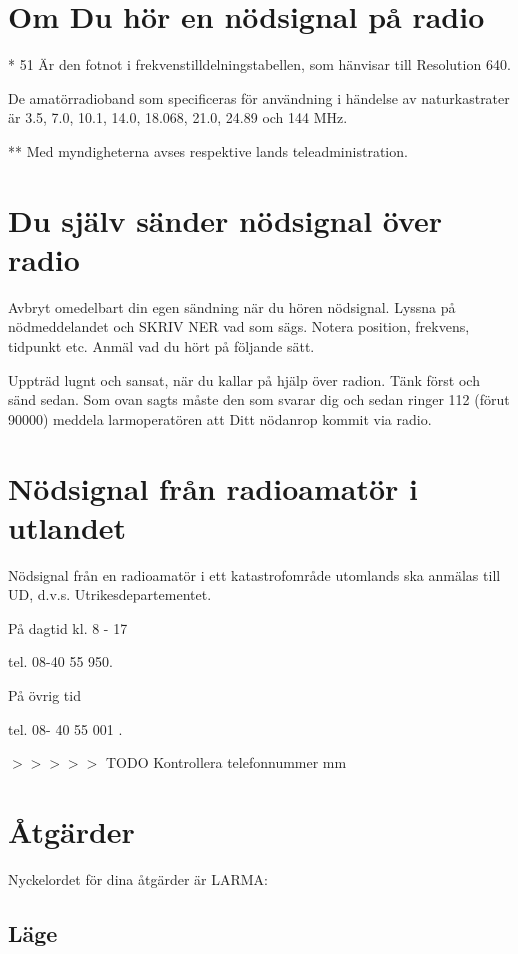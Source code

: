\section{Om Du hör en nödsignal på radio}

* 51 Är den fotnot i frekvenstilldelningstabellen, som hänvisar till Resolution
640.

De amatörradioband som specificeras för användning i händelse av naturkastrater
är 3.5, 7.0, 10.1, 14.0, 18.068, 21.0, 24.89 och 144 MHz.

** Med myndigheterna avses respektive lands teleadministration.

\section{Du själv sänder nödsignal över radio}

Avbryt omedelbart din egen sändning när du hören nödsignal. Lyssna på
nödmeddelandet och SKRIV NER vad som sägs. Notera position, frekvens, tidpunkt
etc. Anmäl vad du hört på följande sätt.

Uppträd lugnt och sansat, när du kallar på hjälp över radion. Tänk först och
sänd sedan. Som ovan sagts måste den som svarar dig och sedan ringer 112 (förut
90000) meddela larmoperatören att Ditt nödanrop kommit via radio.

\section{Nödsignal från radioamatör i utlandet}

Nödsignal från en radioamatör i ett katastrofområde utomlands ska anmälas till UD, d.v.s.
Utrikesdepartementet.

På dagtid kl. 8 - 17

tel. 08-40 55 950.

På övrig tid

tel. 08- 40 55 001 .


$>>>>>$ TODO Kontrollera telefonnummer mm

\section{Åtgärder}

Nyckelordet för dina åtgärder är LARMA:

\subsection{Läge}

